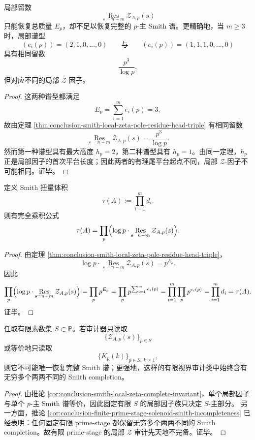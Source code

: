 \begin{proposition}[局部留数层的分类盲性]\label{prop:conclusion-smith-local-residue-classification-blindness}
局部留数
\[
\operatorname*{Res}_{s=n-m}\mathcal Z_{A,p}(s)
\]
只能恢复总质量 \(E_p\)，却不足以恢复完整的 \(p\)-主 Smith 谱。更精确地，当 \(m\ge 3\) 时，局部谱型
\[
(e_i(p))=(2,1,0,\dots,0)
\qquad\text{与}\qquad
(e_i(p))=(1,1,1,0,\dots,0)
\]
具有相同留数
\[
\frac{p^3}{\log p},
\]
但对应不同的局部 \(\mathcal Z\)-因子。
\end{proposition}
\begin{proof}
这两种谱型都满足
\[
E_p=\sum_{i=1}^{m}e_i(p)=3,
\]
故由定理 \ref{thm:conclusion-smith-local-zeta-pole-residue-head-triple} 有相同留数
\[
\operatorname*{Res}_{s=n-m}\mathcal Z_{A,p}(s)=\frac{p^3}{\log p}.
\]
然而第一种谱型具有最大高度 \(h_p=2\)，第二种谱型具有 \(h_p=1\)。由同一定理，\(h_p\) 正是局部因子的首次平台长度；因此两者的有理尾平台起点不同，局部 \(\mathcal Z\)-因子不可能相同。证毕。
\end{proof}

\begin{theorem}\label{thm:conclusion-smith-torsion-volume-from-local-residues}
定义 Smith 扭量体积
\[
\tau(A):=\prod_{i=1}^{m}d_i.
\]
则有完全乘积公式
\[
\tau(A)
=
\prod_{p}\Bigl(\log p\cdot \operatorname*{Res}_{s=n-m}\mathcal Z_{A,p}(s)\Bigr).
\]
\end{theorem}
\begin{proof}
由定理 \ref{thm:conclusion-smith-local-zeta-pole-residue-head-triple}，
\[
\log p\cdot \operatorname*{Res}_{s=n-m}\mathcal Z_{A,p}(s)=p^{E_p}.
\]
因此
\[
\prod_{p}\Bigl(\log p\cdot \operatorname*{Res}_{s=n-m}\mathcal Z_{A,p}(s)\Bigr)
=
\prod_{p}p^{E_p}
=
\prod_{p}p^{\sum_{i=1}^{m}e_i(p)}
=
\prod_{i=1}^{m}\prod_{p}p^{e_i(p)}
=
\prod_{i=1}^{m}d_i
=
\tau(A).
\]
证毕。
\end{proof}

\begin{corollary}\label{cor:conclusion-smith-finite-prime-stage-local-zeta-incomplete}
任取有限素数集 \(S\subset \mathbb P\)。若审计器只读取
\[
\{\mathcal Z_{A,p}(s)\}_{p\in S}
\]
或等价地只读取
\[
\{K_p(k)\}_{p\in S,\ k\ge 1},
\]
则它不可能唯一恢复完整 Smith 谱；更强地，这样的有限视界审计类中始终含有无穷多个两两不同的 Smith completion。
\end{corollary}
\begin{proof}
由推论 \ref{cor:conclusion-smith-local-zeta-complete-invariant}，单个局部因子与单个 \(p\)-主 Smith 谱等价，因此固定有限 \(S\) 的局部因子族只决定 \(S\)-主部分。
另一方面，推论 \ref{cor:conclusion-finite-prime-stage-solenoid-smith-incompleteness} 已经表明：任何固定有限 prime-stage 都保留无穷多个两两不同的 Smith completion。故有限 prime-stage 的局部 \(\mathcal Z\) 审计先天地不完备。证毕。
\end{proof}

